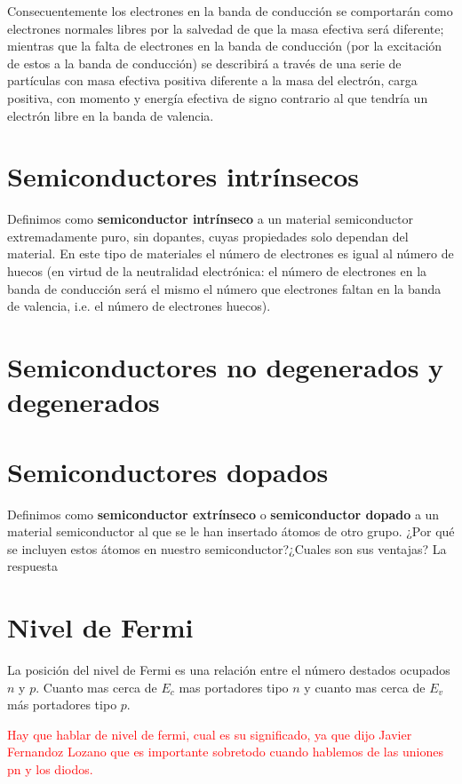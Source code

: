 Consecuentemente los electrones en la banda de conducción se comportarán como electrones normales libres por la salvedad de que la masa efectiva será diferente; mientras que la falta de electrones en la banda de conducción (por la excitación de estos a la banda de conducción) se describirá a través de una serie de partículas con masa efectiva positiva diferente a la masa del electrón, carga positiva, con momento y energía efectiva de signo contrario al que tendría un electrón libre en la banda de valencia.

\section{Semiconductores intrínsecos}

Definimos como \textbf{semiconductor intrínseco} a un material semiconductor extremadamente puro, sin dopantes, cuyas propiedades solo dependan del material. En este tipo de materiales el número de electrones es igual al número de huecos (en virtud de la neutralidad electrónica: el número de electrones en la banda de conducción será el mismo el número que electrones faltan en la banda de valencia, i.e. el número de electrones huecos).


\section{Semiconductores no degenerados y degenerados}

\section{Semiconductores dopados}

Definimos como \textbf{semiconductor extrínseco} o \textbf{semiconductor dopado} a un material semiconductor al que se le han insertado átomos de otro grupo. ¿Por qué se incluyen estos átomos en nuestro semiconductor?¿Cuales son sus ventajas? La respuesta

\section{Nivel de Fermi}

La posición del nivel de Fermi es una relación entre el número destados ocupados $n$ y $p$. Cuanto mas cerca de $E_c$ mas portadores tipo $n$ y cuanto mas cerca de $E_v$ más portadores tipo $p$. 

\begin{Anotacion}
	\textcolor{red}{Hay que hablar de nivel de fermi, cual es su significado, ya que dijo Javier Fernandoz Lozano que es importante sobretodo cuando hablemos de las uniones pn y los diodos. }
\end{Anotacion}

